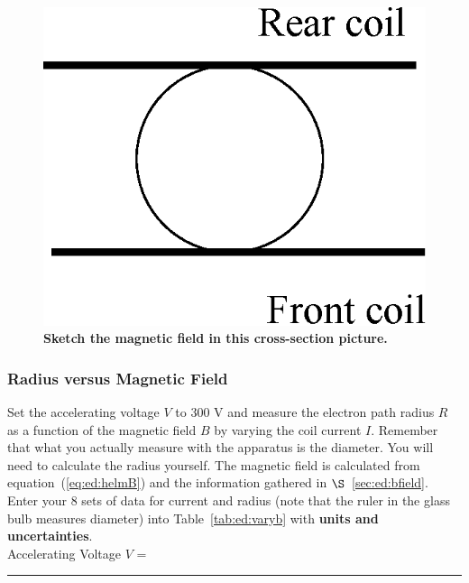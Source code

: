 \begin{figure}[!htb]
\vspace*{1.9cm}
\centering
\epsfxsize=6cm \includegraphics[scale=0.6]{3_electrondynamics/csect.eps}
\vspace*{2cm}
\caption{\textbf{Sketch the magnetic field in this cross-section picture.}} 
\label{fig:ed:worksketch}
\end{figure}

\vfill 
\newpage

\subsubsection{Radius versus Magnetic Field}
\label{sec:ed:varyB}

Set the accelerating voltage $V$ to 300 V and measure the electron 
path radius $R$ as a function of the magnetic field $B$ by varying the coil 
current $I$.  Remember that what you actually measure with the apparatus is
the diameter. You will need to calculate the radius yourself. The 
magnetic field is calculated from equation~(\ref{eq:ed:helmB}) and the 
information gathered in $\S$~\ref{sec:ed:bfield}. 
Enter your 8 sets of data for current and radius (note that the ruler
in the glass bulb measures diameter) into Table~\ref{tab:ed:varyb} with
{\bf units and uncertainties}.\\

\hspace{3cm} Accelerating Voltage $V$ =~\rule{3cm}{.1mm}  


